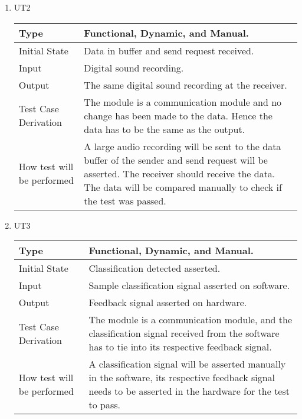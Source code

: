 \documentclass[12pt, titlepage]{article}
\begin{document}
\begin{enumerate}

\item{UT2\\}

\begin{tabular}{ |p{5cm}||p{7cm}| }
    \hline
    Type & Functional, Dynamic, and Manual. \\
    \hline
    Initial State  &  Data in buffer and send request received. \\
    \hline
    Input &   Digital sound recording.  \\
    \hline
    Output &   The same digital sound recording at the receiver.  \\
    \hline
    Test Case Derivation &   The module is a communication module and no change has been made to the data. Hence the data has to be the same as the output.\\
    \hline
    How test will be performed & A large audio recording will be sent to the data buffer of the sender and send request will be asserted. The receiver should receive the data. The data will be compared manually to check if the test was passed.\\
    \hline
\end{tabular}

\item{UT3\\}

\begin{tabular}{ |p{5cm}||p{7cm}| }
    \hline
    Type & Functional, Dynamic, and Manual. \\
    \hline
    Initial State  &  Classification detected asserted. \\
    \hline
    Input &   Sample classification signal asserted on software.  \\
    \hline
    Output &   Feedback signal asserted on hardware.  \\
    \hline
    Test Case Derivation &   The module is a communication module, and the classification signal received from the software has to tie into its respective feedback signal.\\
    \hline
    How test will be performed & A classification signal will be asserted manually in the software, its respective feedback signal needs to be asserted in the hardware for the test to pass.\\
    \hline
\end{tabular}

\end{enumerate}
\end{document}
